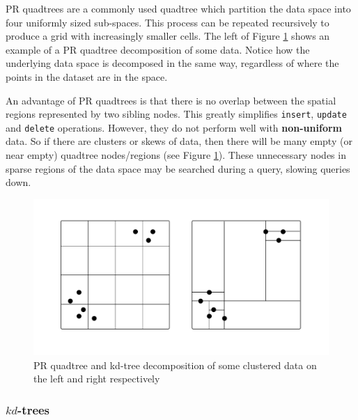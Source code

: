 PR quadtrees are a commonly used quadtree which partition the data space into four uniformly sized sub-spaces. This process can be repeated recursively to produce a grid with increasingly smaller cells. The left of Figure \ref{fig:quadtree-kdtree-clustered} shows an example of a PR quadtree decomposition of some data. Notice how the underlying data space is decomposed in the same way, regardless of where the points in the dataset are in the space.

An advantage of PR quadtrees is that there is no overlap between the spatial regions represented by two sibling nodes. This greatly simplifies \texttt{insert}, \texttt{update} and \texttt{delete} operations. However, they do not perform well with \textbf{non-uniform} data. So if there are clusters or skews of data, then there will be many empty (or near empty) quadtree nodes/regions (see Figure \ref{fig:quadtree-kdtree-clustered}). These unnecessary nodes in sparse regions of the data space may be searched during a query, slowing queries down.

\begin{figure}
	\vspace{-40pt}
	\begin{center}
		\includegraphics[scale=0.35]{figures/quadtrees_kdtrees_clustered.pdf}
	\end{center}
	\vspace{-30pt}
	\caption{PR quadtree and kd-tree decomposition of some clustered data on the left and right respectively}
	\label{fig:quadtree-kdtree-clustered}
\end{figure}

\subsubsection{$kd$-trees}

